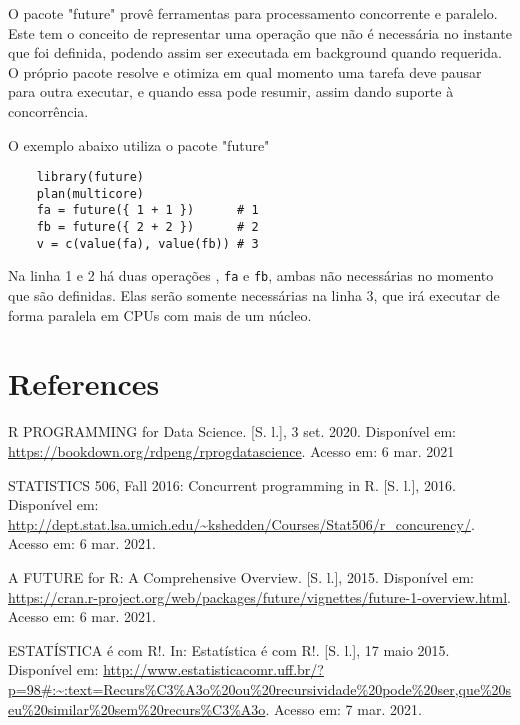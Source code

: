 \documentclass[12pt]{article}
\begin{document}
O pacote "future" provê ferramentas para processamento concorrente e paralelo. Este tem o conceito de representar uma operação que não é necessária no instante que foi definida, podendo assim ser executada em background quando requerida. O próprio pacote resolve e otimiza em qual momento uma tarefa deve pausar para outra executar, e quando essa pode resumir, assim dando suporte à concorrência. 

O exemplo abaixo utiliza o pacote "future"

\begin{verbatim}
    library(future)
    plan(multicore)
    fa = future({ 1 + 1 })      # 1
    fb = future({ 2 + 2 })      # 2
    v = c(value(fa), value(fb)) # 3
\end{verbatim}

Na linha 1 e 2 há duas operações , \texttt{fa} e \texttt{fb}, ambas não necessárias no momento que são definidas. Elas serão somente necessárias na linha 3, que irá executar de forma paralela em CPUs com mais de um núcleo. 

\section{References}
R PROGRAMMING for Data Science. [S. l.], 3 set. 2020. Disponível em: \url{https://bookdown.org/rdpeng/rprogdatascience}. Acesso em: 6 mar. 2021

STATISTICS 506, Fall 2016: Concurrent programming in R. [S. l.], 2016. Disponível em: \url{http://dept.stat.lsa.umich.edu/~kshedden/Courses/Stat506/r_concurency/}. Acesso em: 6 mar. 2021.

A FUTURE for R: A Comprehensive Overview. [S. l.], 2015. Disponível em: \url{https://cran.r-project.org/web/packages/future/vignettes/future-1-overview.html}. Acesso em: 6 mar. 2021.

ESTATÍSTICA é com R!. In: Estatística é com R!. [S. l.], 17 maio 2015. Disponível em: \url{http://www.estatisticacomr.uff.br/?p=98#:~:text=Recurs%C3%A3o%20ou%20recursividade%20pode%20ser,que%20seu%20similar%20sem%20recurs%C3%A3o}. Acesso em: 7 mar. 2021.
\end{document}
